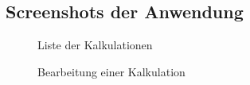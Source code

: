 \subsection{Screenshots der Anwendung}
\label{Screenshots}
\begin{figure}[htb]
\centering
{}
\caption{Liste der Kalkulationen}
\end{figure}
\clearpage
\begin{figure}[htb]
\centering
{}
\caption{Bearbeitung einer Kalkulation}
\end{figure}
\clearpage
